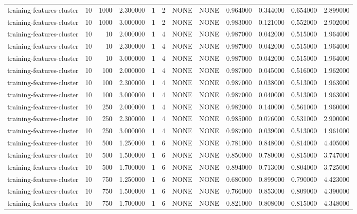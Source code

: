 \begin{tabular}{lrrrllllrrrr}
training-features-cluster & 10 & 1000 & 2.300000 & 1 & 2 & NONE & NONE & 0.964000 & 0.344000 & 0.654000 & 2.899000 \\
training-features-cluster & 10 & 1000 & 3.000000 & 1 & 2 & NONE & NONE & 0.983000 & 0.121000 & 0.552000 & 2.902000 \\
training-features-cluster & 10 & 10 & 2.000000 & 1 & 4 & NONE & NONE & 0.987000 & 0.042000 & 0.515000 & 1.964000 \\
training-features-cluster & 10 & 10 & 2.300000 & 1 & 4 & NONE & NONE & 0.987000 & 0.042000 & 0.515000 & 1.964000 \\
training-features-cluster & 10 & 10 & 3.000000 & 1 & 4 & NONE & NONE & 0.987000 & 0.042000 & 0.515000 & 1.964000 \\
training-features-cluster & 10 & 100 & 2.000000 & 1 & 4 & NONE & NONE & 0.987000 & 0.045000 & 0.516000 & 1.962000 \\
training-features-cluster & 10 & 100 & 2.300000 & 1 & 4 & NONE & NONE & 0.987000 & 0.038000 & 0.513000 & 1.963000 \\
training-features-cluster & 10 & 100 & 3.000000 & 1 & 4 & NONE & NONE & 0.987000 & 0.040000 & 0.513000 & 1.963000 \\
training-features-cluster & 10 & 250 & 2.000000 & 1 & 4 & NONE & NONE & 0.982000 & 0.140000 & 0.561000 & 1.960000 \\
training-features-cluster & 10 & 250 & 2.300000 & 1 & 4 & NONE & NONE & 0.985000 & 0.076000 & 0.531000 & 2.900000 \\
training-features-cluster & 10 & 250 & 3.000000 & 1 & 4 & NONE & NONE & 0.987000 & 0.039000 & 0.513000 & 1.961000 \\
training-features-cluster & 10 & 500 & 1.250000 & 1 & 6 & NONE & NONE & 0.781000 & 0.848000 & 0.814000 & 4.405000 \\
training-features-cluster & 10 & 500 & 1.500000 & 1 & 6 & NONE & NONE & 0.850000 & 0.780000 & 0.815000 & 3.747000 \\
training-features-cluster & 10 & 500 & 1.700000 & 1 & 6 & NONE & NONE & 0.894000 & 0.713000 & 0.804000 & 3.725000 \\
training-features-cluster & 10 & 750 & 1.250000 & 1 & 6 & NONE & NONE & 0.680000 & 0.899000 & 0.790000 & 4.423000 \\
training-features-cluster & 10 & 750 & 1.500000 & 1 & 6 & NONE & NONE & 0.766000 & 0.853000 & 0.809000 & 4.390000 \\
training-features-cluster & 10 & 750 & 1.700000 & 1 & 6 & NONE & NONE & 0.821000 & 0.808000 & 0.815000 & 4.348000 \\

\end{tabular}
